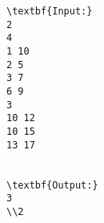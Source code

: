 \begin{verbatim}
\textbf{Input:}
2
4
1 10
2 5
3 7
6 9
3
10 12
10 15
13 17


\textbf{Output:}
3
\\2\end{verbatim}